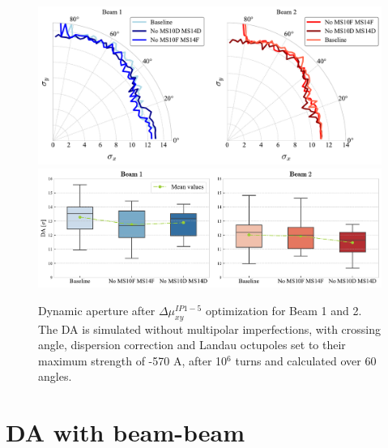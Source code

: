 \documentclass{cernatsnote}
\begin{document}
\begin{figure}[h!]
\centering
\includegraphics[width=1\textwidth]{images/da_polar_1addsext_b12.pdf} \\
\includegraphics[width=1\textwidth]{images/da_1addsext_b12.pdf}
\caption{\label{da_final_all} Dynamic aperture after $\Delta\mu_{xy}^{IP1-5}$ optimization for Beam 1 and 2. The DA is simulated without multipolar imperfections, with crossing angle, dispersion correction and Landau octupoles set to their maximum strength of -570 A, after 10$^{6}$ turns and calculated over 60 angles. }
\end{figure}



\section{DA with beam-beam}
\end{document}
